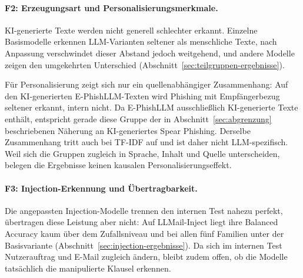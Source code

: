\documentclass[12pt,twoside=false,a4paper,parskip]{scrbook}
\begin{document}
\paragraph{F2: Erzeugungsart und Personalisierungsmerkmale.}
KI-generierte Texte werden nicht generell schlechter erkannt. Einzelne Basismodelle erkennen LLM-Varianten seltener als menschliche Texte, nach Anpassung verschwindet dieser Abstand jedoch weitgehend, und andere Modelle zeigen den umgekehrten Unterschied (Abschnitt~\ref{sec:teilgruppen-ergebnisse}).

Für Personalisierung zeigt sich nur ein quellenabhängiger Zusammenhang: Auf den KI-generierten E-PhishLLM-Texten wird Phishing mit Empfängerbezug seltener erkannt, intern nicht. Da E-PhishLLM ausschließlich KI-generierte Texte enthält, entspricht gerade diese Gruppe der in Abschnitt~\ref{sec:abgrenzung} beschriebenen Näherung an KI-generiertes Spear Phishing. Derselbe Zusammenhang tritt auch bei TF-IDF auf und ist daher nicht LLM-spezifisch. Weil sich die Gruppen zugleich in Sprache, Inhalt und Quelle unterscheiden, belegen die Ergebnisse keinen kausalen Personalisierungseffekt.

\paragraph{F3: Injection-Erkennung und Übertragbarkeit.}
Die angepassten Injection-Modelle trennen den internen Test nahezu perfekt, übertragen diese Leistung aber nicht: Auf LLMail-Inject liegt ihre Balanced Accuracy kaum über dem Zufallsniveau und bei allen fünf Familien unter der Basisvariante (Abschnitt~\ref{sec:injection-ergebnisse}). Da sich im internen Test Nutzerauftrag und E-Mail zugleich ändern, bleibt zudem offen, ob die Modelle tatsächlich die manipulierte Klausel erkennen.
\end{document}
